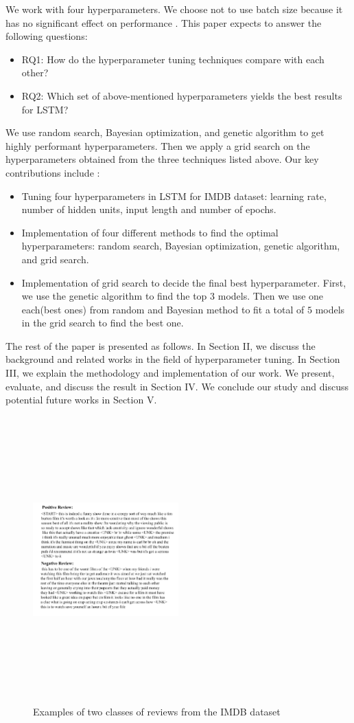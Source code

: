 \documentclass[conference]{IEEEtran}
\begin{document}
We work with four hyperparameters. We choose not to use batch size because it has no significant effect on performance \cite{batch}. This paper expects to answer the following questions: \begin{itemize}
\item  RQ1: How do the hyperparameter tuning techniques compare with each other?
\item  RQ2: Which set of above-mentioned hyperparameters yields the best results for LSTM?

    
\end{itemize}
We use random search, Bayesian optimization, and genetic algorithm to get highly performant hyperparameters. 
Then we apply a grid search on the hyperparameters obtained from the three techniques listed above. 
Our key contributions include :  
\begin{itemize}
    \item Tuning four hyperparameters in LSTM for IMDB dataset: learning rate, number of hidden units, input length and number of epochs.
    \item Implementation of four different methods to find the optimal hyperparameters: random search, Bayesian optimization, genetic algorithm, and grid search.
    \item Implementation of grid search to decide the final best hyperparameter. First, we use the genetic algorithm to find the top $3$ models. Then we use one each(best ones) from random and Bayesian method to fit a total of $5$ models in the grid search to find the best one.
\end{itemize}
The rest of the paper is presented as follows. In Section II, we discuss the background and related works in the field of hyperparameter tuning. In Section III, we explain the methodology and implementation of our work. We present, evaluate, and discuss the result in Section IV. We conclude our study and discuss potential future works in Section V.

\begin{figure}
\includegraphics[width=0.5\textwidth, height=11cm, keepaspectratio]{posnegtypes.png}
\caption{Examples of two classes of reviews from the IMDB dataset}
 \label{fig:eg}
\end{figure}
\end{document}
